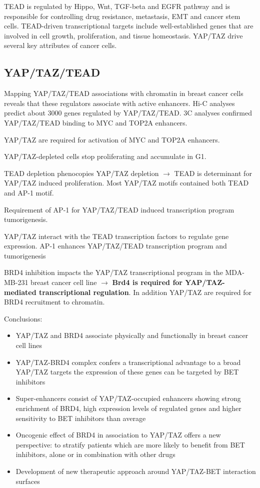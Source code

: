 TEAD is regulated by Hippo, Wnt, TGF-beta and EGFR pathway and is responsible for controlling drug resistance, metastasis, EMT and cancer stem cells. TEAD-driven transcriptional targets include well-established genes that are involved in cell growth, proliferation, and tissue homeostasis. YAP/TAZ drive several key attributes of cancer cells.

\hypertarget{yaptaztead}{%
\subsection{YAP/TAZ/TEAD}\label{yaptaztead}}

Mapping YAP/TAZ/TEAD associations with chromatin in breast cancer cells reveals that these regulators associate with active enhancers. Hi-C analyses predict about 3000 genes regulated by YAP/TAZ/TEAD. 3C analyses confirmed YAP/TAZ/TEAD binding to MYC and TOP2A enhancers.

YAP/TAZ are required for activation of MYC and TOP2A enhancers.

YAP/TAZ-depleted cells stop proliferating and accumulate in G1.

TEAD depletion phenocopies YAP/TAZ depletion $\rightarrow$ TEAD is determinant for YAP/TAZ induced proliferation. Most YAP/TAZ motifs contained both TEAD and AP-1 motif.

Requirement of AP-1 for YAP/TAZ/TEAD induced transcription program tumorigenesis.

YAP/TAZ interact with the TEAD transcription factors to regulate gene expression. AP-1 enhances YAP/TAZ/TEAD transcription program and tumorigenesis

BRD4 inhibition impacts the YAP/TAZ transcriptional program in the MDA-MB-231 breast cancer cell line $\rightarrow$ \textbf{Brd4 is required for YAP/TAZ-mediated transcriptional regulation}. In addition YAP/TAZ are required for BRD4 recruitment to chromatin.

Conclusions:

\begin{itemize}
\tightlist
\item
  YAP/TAZ and BRD4 associate physically and functionally in breast cancer cell lines
\item
  YAP/TAZ-BRD4 complex confers a transcriptional advantage to a broad YAP/TAZ targets the expression of these genes can be targeted by BET inhibitors
\item
  Super-enhancers consist of YAP/TAZ-occupied enhancers showing strong enrichment of BRD4, high expression levels of regulated genes and higher sensitivity to BET inhibitors than average
\item
  Oncogenic effect of BRD4 in association to YAP/TAZ offers a new perspective:
  to stratify patients which are more likely to benefit from BET inhibitors, alone or in combination with other drugs
\item
  Development of new therapeutic approach around YAP/TAZ-BET interaction surfaces
\end{itemize}

